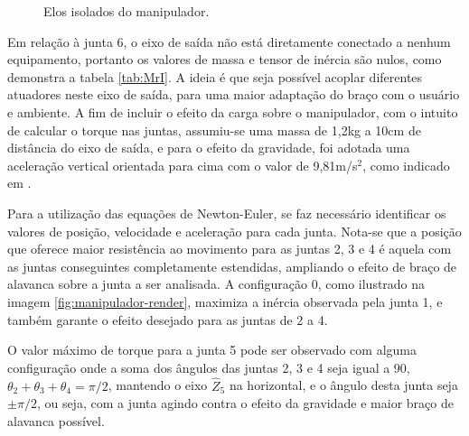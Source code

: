 \begin{figure}[h]
\begin{centering}
\begin{floatrow}
    \end{floatrow}


\caption{Elos isolados do manipulador.}
\label{fig:elos}

\par\end{centering}
\end{figure}

Em relação à junta 6, o eixo de saída não está diretamente conectado a nenhum equipamento, 
portanto os valores de massa e tensor de inércia são nulos, como demonstra a tabela
\ref{tab:MrI}. A ideia é que seja possível acoplar diferentes atuadores neste eixo de
saída, para uma maior adaptação do braço com o usuário e ambiente. A fim de incluir o 
efeito da carga sobre o manipulador, com o intuito de calcular o torque nas juntas, 
assumiu-se uma massa de 1,2kg a 10cm de distância do eixo de saída, e para o efeito
da gravidade, foi adotada uma aceleração vertical orientada para cima com o valor
de 9,81m/s$^2$, como indicado em \cite{craig2009introduction}.

Para a utilização das equações de Newton-Euler, se faz necessário identificar os
valores de posição, velocidade e aceleração para cada junta. Nota-se que a posição que
oferece maior resistência ao movimento para as juntas 2, 3 e 4 é aquela com as juntas 
conseguintes completamente estendidas, ampliando o efeito de braço de alavanca sobre a 
junta a ser analisada. A configuração 0, como ilustrado na imagem \ref{fig:manipulador-render}, 
maximiza a inércia observada pela junta 1, e também garante o efeito desejado para as 
juntas de 2 a 4.

O valor máximo de torque para a junta 5 pode ser observado com alguma configuração onde
a soma dos ângulos das juntas 2, 3 e 4 seja igual a 90\textdegree, $\theta_2+\theta_3+\theta_4=\pi/2$,
mantendo o eixo $\hat{Z}_5$ na horizontal, e o ângulo desta junta seja $\pm \pi/2$, ou seja, 
com a junta agindo contra o efeito da gravidade e maior braço de alavanca possível. 

